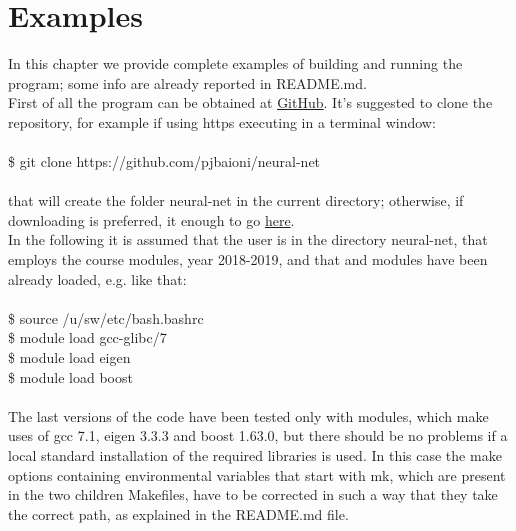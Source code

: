 \documentclass[12pt, a4paper]{report}
\theoremstyle{definition}
\begin{document}
\chapter{Examples}\label{chapter4}
\setcounter{figure}{11}
In this chapter we provide complete examples of building and running the program; some info are already reported in README.md.\\
First of all the program can be obtained at \href{https://github.com/pjbaioni/neural-net}{GitHub}. It's suggested to clone the repository, for example if using https executing in a terminal window:\\
{\\ \ttfamily 
	\$ git clone https://github.com/pjbaioni/neural-net\\
\\}
that will create the folder neural-net in the current directory; otherwise, if downloading is preferred, it enough to go \href{https://github.com/pjbaioni/neural-net/archive/master.zip}{here}.\\
In the following it is assumed that the user is in the directory neural-net, that employs the \cite{pacs} course modules, year 2018-2019, and that \cite{eigen} and \cite{boost} modules have been already loaded, e.g. like that:\\
{\\ \ttfamily 
	\$ source /u/sw/etc/bash.bashrc\\
	\$ module load gcc-glibc/7\\
	\$ module load eigen\\
	\$ module load boost\\
	\\}
The last versions of the code have been tested only with modules, which make uses of gcc 7.1, eigen 3.3.3 and boost 1.63.0, but there should be no problems if a local standard installation of the required libraries is used. In this case the make options containing environmental variables that start with {\ttfamily mk}, which are present in the two children Makefiles, have to be corrected in such a way that they take the correct path, as explained in the README.md file.
\newpage
\end{document}
